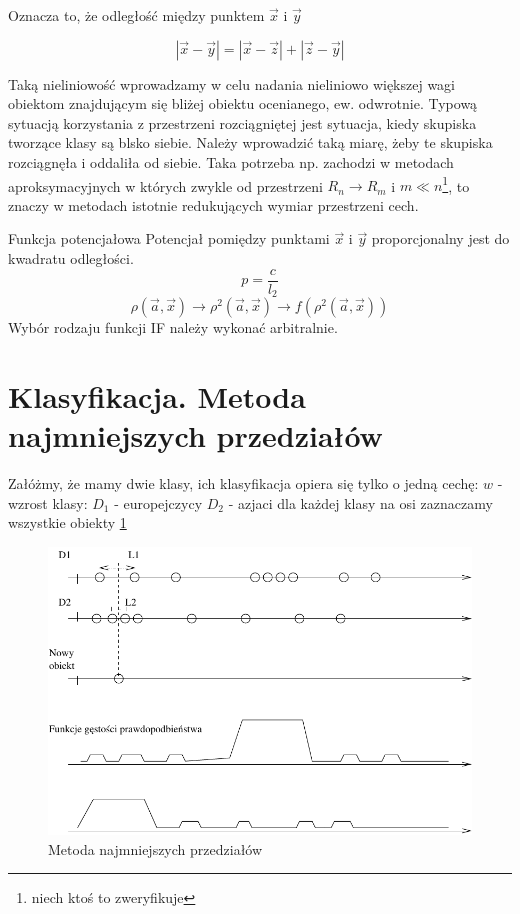 \documentclass[a4paper,10pt]{article}
\begin{document}
Oznacza to, że odległość między punktem $\overrightarrow{x}$ i $\overrightarrow{y}$

\begin{equation}
|\overrightarrow{x} - \overrightarrow{y}| = |\overrightarrow{x} - \overrightarrow{z}| + |\overrightarrow{z} - \overrightarrow{y}|
\end{equation}

Taką nieliniowość wprowadzamy w celu nadania nieliniowo większej wagi obiektom znajdującym się bliżej obiektu ocenianego, ew. odwrotnie. Typową sytuacją korzystania z przestrzeni rozciągniętej jest sytuacja, kiedy skupiska tworzące klasy są blsko siebie. Należy wprowadzić taką miarę, żeby te skupiska rozciągnęła i oddaliła od siebie. Taka potrzeba np. zachodzi w metodach aproksymacyjnych w których zwykle od przestrzeni $R_n \rightarrow R_m$ i $m \ll n$\footnote{niech ktoś to zweryfikuje}, to znaczy w metodach istotnie redukujących wymiar przestrzeni cech.

Funkcja potencjałowa
Potencjał pomiędzy punktami $\overrightarrow{x}$ i $\overrightarrow{y}$ proporcjonalny jest do kwadratu odległości.
\begin{equation}
p = \frac{c}{l_2}
\end{equation}
\begin{equation}
\rho(\overrightarrow{a}, \overrightarrow{x}) \rightarrow \rho^2(\overrightarrow{a}, \overrightarrow{x}) \rightarrow f(\rho^2(\overrightarrow{a}, \overrightarrow{x}))
\end{equation}
Wybór rodzaju funkcji IF należy wykonać arbitralnie.

\section{Klasyfikacja. Metoda najmniejszych przedziałów}
Załóżmy, że mamy dwie klasy, ich klasyfikacja opiera się tylko o jedną cechę:
$w$ - wzrost
klasy:
$D_1$ - europejczycy
$D_2$ - azjaci
dla każdej klasy na osi zaznaczamy wszystkie obiekty \ref{fig:min_dist}
\begin{figure}[h]
  \centering
  \includegraphics[width=\textwidth]{min_przed.pdf}
  \caption{Metoda najmniejszych przedziałów}
  \label{fig:min_dist}
\end{figure}
\end{document}
